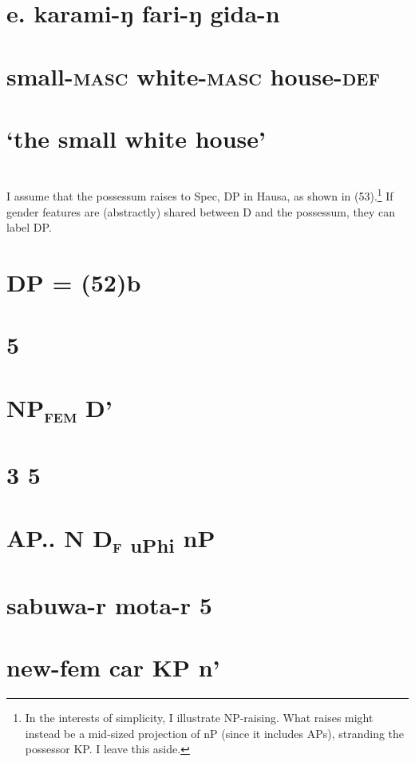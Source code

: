 \documentclass[output=paper
,modfonts
,nonflat]{langsci/langscibook}
\begin{document}
\section{  e.    karami-ŋ     fari-ŋ         gida-n}
\section{     small-\textsc{masc}     white-\textsc{masc}  house-\textsc{def}}
\section{      ‘the small white house’}
\section{\rmfamily} 

I assume that the possessum raises to Spec, DP in Hausa, as shown in (53).\footnote{In the interests of simplicity, I illustrate NP-raising. What raises might instead be a mid-sized projection of nP (since it includes APs), stranding the possessor KP. I leave this aside.} If gender features are (abstractly) shared between D and the possessum, they can label DP. 

\section{        DP              = (52)b}
\label{bkm:Ref512519846}\section{      5}
\section{    NP\textsc{\textsubscript{fem}}          D’}
\section{  3    5}
\section{  AP..        N        D\textsc{\textsubscript{f}}\textsubscript{} \textsubscript{uPhi}         nP}
\section{     sabuwa-r   mota-r               5}
\section{    new-fem  car                    KP              n’}
\end{document}
